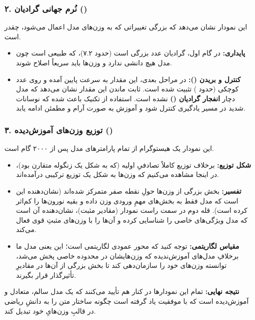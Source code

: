 \documentclass{article}
\begin{document}
\subsubsection*{۲. نُرم جهانی گرادیان ()}
این نمودار نشان می‌دهد که بزرگی تغییراتی که به وزن‌های مدل اعمال می‌شود، چقدر است.
\begin{itemize}
	\item \textbf{پایداری:} در گام اول، گرادیان عدد بزرگی است (حدود ۷.۲)، که طبیعی است چون مدل هیچ دانشی ندارد و وزن‌ها باید سریعاً اصلاح شوند.
	\item \textbf{کنترل و بریدن ():} در مراحل بعدی، این مقدار به سرعت پایین آمده و روی عدد کوچکی (حدود ) تثبیت شده است. ثابت ماندن این مقدار نشان می‌دهد که مدل دچار \textbf{انفجار گرادیان ()} نشده است. استفاده از تکنیک  باعث شده که نوسانات شدید در مسیر یادگیری کنترل شود و آموزش به صورت آرام و مطمئن ادامه یابد.
\end{itemize}

\subsubsection*{۳. توزیع وزن‌های آموزش‌دیده ()}
این نمودار یک هیستوگرام از تمام پارامترهای مدل پس از ۲۰۰۰ گام است.
\begin{itemize}
	\item \textbf{شکل توزیع:} برخلاف توزیع کاملاً تصادفیِ اولیه (که به شکل یک زنگوله متقارن بود)، در اینجا مشاهده می‌کنیم که وزن‌ها به شکل یک توزیع ترکیبی درآمده‌اند.
	\item \textbf{تفسیر:} بخش بزرگی از وزن‌ها حولِ نقطه صفر متمرکز شده‌اند (نشان‌دهنده این است که مدل فقط به بخش‌های مهمِ ورودی وزن داده و بقیه نورون‌ها را کم‌اثر کرده است). قله دوم در سمت راست نمودار (مقادیر مثبت)، نشان‌دهنده آن است که مدل ویژگی‌های خاصی را شناسایی کرده و آن‌ها را با وزن‌های مثبتِ قوی فعال می‌کند.
	\item \textbf{مقیاس لگاریتمی:} توجه کنید که محور عمودی لگاریتمی است؛ این یعنی مدل ما برخلافِ مدل‌های آموزش‌ندیده که وزن‌هایشان در محدوده خاصی پخش می‌شد، توانسته وزن‌های خود را سازمان‌دهی کند تا بخش بزرگی از آن‌ها در مقادیرِ تأثیرگذار قرار بگیرند. 
\end{itemize}

\textbf{نتیجه نهایی:} تمام این نمودارها در کنار هم تأیید می‌کنند که  یک مدل سالم، متعادل و آموزش‌دیده است که با موفقیت یاد گرفته است چگونه ساختار متن را به دانشِ ریاضی در قالبِ وزن‌هایِ خود تبدیل کند. 
\end{document}
